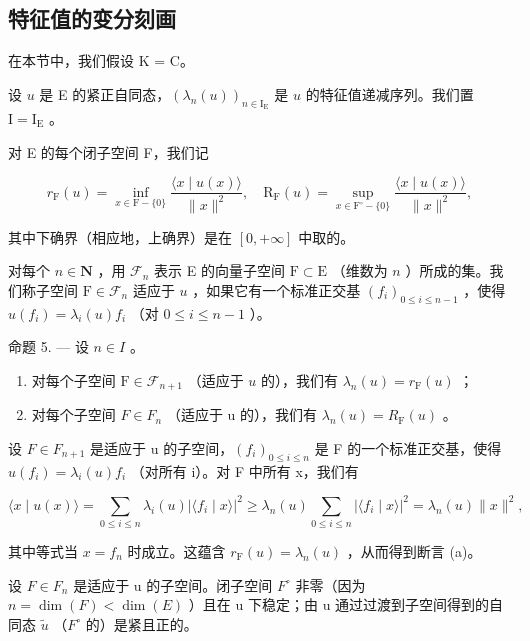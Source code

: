 \subsection{特征值的变分刻画}

在本节中，我们假设 K = C。

设 \(u\) 是 E 的紧正自同态，\((\lambda_n(u))_{n\in \mathrm{I_E}}\) 是 \(u\) 的特征值递减序列。我们置 \(\mathrm{I} = \mathrm{I_E}\) 。

对 E 的每个闭子空间 F，我们记

\[
r _ {\mathrm{F}} (u) = \inf _ {x \in \mathrm{F} - \{0 \}} \frac {\langle x \mid u (x) \rangle}{\| x \| ^ {2}}, \quad \mathrm{R} _ {\mathrm{F}} (u) = \sup _ {x \in \mathrm{F} ^ {\circ} - \{0 \}} \frac {\langle x \mid u (x) \rangle}{\| x \| ^ {2}},
\]

其中下确界（相应地，上确界）是在 \([0, +\infty]\) 中取的。

对每个 \(n \in \mathbf{N}\) ，用 \(\mathcal{F}_n\) 表示 E 的向量子空间 \(\mathrm{F} \subset \mathrm{E}\) （维数为 \(n\) ）所成的集。我们称子空间 \(\mathrm{F} \in \mathcal{F}_n\) 适应于 \(u\) ，如果它有一个标准正交基 \((f_i)_{0 \leqslant i \leqslant n-1}\) ，使得 \(u(f_i) = \lambda_i(u)f_i\) （对 \(0 \leqslant i \leqslant n-1\) ）。

命题 5. --- 设 \(n \in I\) 。

\begin{enumerate}
\def\labelenumi{\alph{enumi})}
\item
  对每个子空间 \(\mathrm{F} \in \mathcal{F}_{n+1}\) （适应于 \(u\) 的），我们有 \(\lambda_n(u) = r_{\mathrm{F}}(u)\) ；
\item
  对每个子空间 \(F \in F_{n}\) （适应于 u 的），我们有 \(\lambda_{n}(u) = R_{\mathrm{F}}(u)\) 。
\end{enumerate}

设 \(F \in F_{n+1}\) 是适应于 u 的子空间，\((f_i)_{0 \leqslant i \leqslant n}\) 是 F 的一个标准正交基，使得 \(u(f_i) = \lambda_i(u)f_i\) （对所有 i）。对 F 中所有 x，我们有

\[
\langle x \mid u (x) \rangle = \sum_ {0 \leqslant i \leqslant n} \lambda_ {i} (u) | \langle f _ {i} \mid x \rangle | ^ {2} \geqslant \lambda_ {n} (u) \sum_ {0 \leqslant i \leqslant n} | \langle f _ {i} \mid x \rangle | ^ {2} = \lambda_ {n} (u) \| x \| ^ {2},
\]

其中等式当 \(x = f_{n}\) 时成立。这蕴含 \(r_{\mathrm{F}}(u) = \lambda_{n}(u)\) ，从而得到断言 (a)。

设 \(F \in F_{n}\) 是适应于 u 的子空间。闭子空间 \(F^{\circ}\) 非零（因为 \(n = \dim(F) < \dim(E)\) ）且在 u 下稳定；由 u 通过过渡到子空间得到的自同态 \(\widetilde{u}\) （\(F^{\circ}\) 的）是紧且正的。

